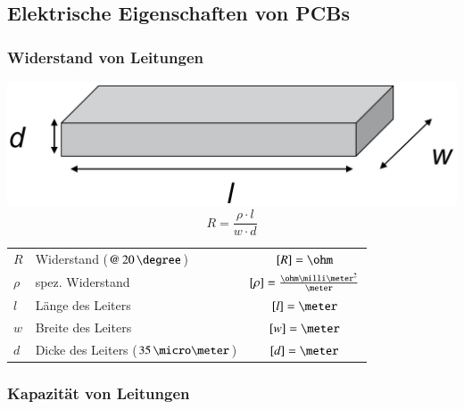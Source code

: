 \subsection{Elektrische Eigenschaften von PCBs}

\subsubsection{Widerstand von Leitungen}

\begin{minipage}[t]{0.35\columnwidth}
    \includegraphics[width=\columnwidth]{images/leitung_widerstand.jpg}
    $$ \boxed{R = \frac{\rho \cdot l}{w \cdot d}} $$
\end{minipage}
\hfill
\begin{minipage}[t]{0.62\columnwidth}
    \begin{tabular}{llc}
        $R$     & Widerstand ($@ \, 20 \, \degree$)         & $[R] = \ohm$ \\
        $\rho$  & spez. Widerstand                          & $[\rho] = \frac{\ohm \milli \meter^2}{\meter}$ \\
        $l$     & Länge des Leiters                         & $[l] = \meter$ \\
        $w$     & Breite des Leiters                        & $[w] = \meter$ \\
        $d$     & Dicke des Leiters ($35 \, \micro \meter$) & $[d] = \meter$ 
    \end{tabular}
\end{minipage}


\subsubsection{Kapazität von Leitungen}

